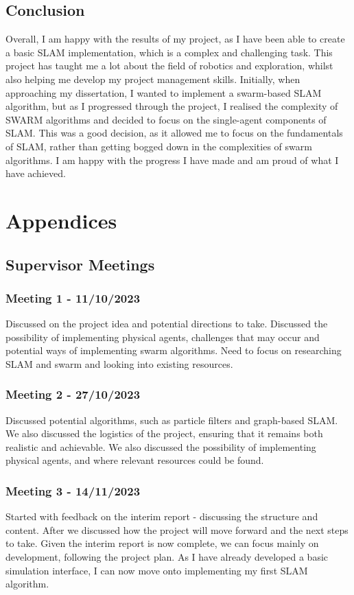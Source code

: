 \documentclass[12pt]{article}
\begin{document}
\subsection{Conclusion}
Overall, I am happy with the results of my project, as I have been able to create a basic SLAM implementation, which is a complex and challenging
task. This project has taught me a lot about the field of robotics and exploration, whilst also helping me develop my project management skills.
Initially, when approaching my dissertation, I wanted to implement a swarm-based SLAM algorithm, but as I progressed through the project, I realised
the complexity of SWARM algorithms and decided to focus on the single-agent components of SLAM. This was a good decision, as it allowed me to
focus on the fundamentals of SLAM, rather than getting bogged down in the complexities of swarm algorithms. I am happy with the progress I have
made and am proud of what I have achieved.\\

\newpage

\section{Appendices}

\subsection{Supervisor Meetings}    %

\subsubsection{Meeting 1 - 11/10/2023}
Discussed on the project idea and potential directions to take. Discussed the possibility of implementing physical agents,
challenges that may occur and potential ways of implementing swarm algorithms. Need to focus on researching SLAM and swarm
and looking into existing resources.
\subsubsection{Meeting 2 - 27/10/2023}
Discussed potential algorithms, such as particle filters and graph-based SLAM. We also discussed the logistics of the project,
ensuring that it remains both realistic and achievable. We also discussed the possibility of implementing physical agents,
and where relevant resources could be found.
\subsubsection{Meeting 3 - 14/11/2023}
Started with feedback on the interim report - discussing the structure and content. After we discussed how the project will
move forward and the next steps to take. Given the interim report is now complete, we can focus mainly on development, following
the project plan. As I have already developed a basic simulation interface, I can now move onto implementing my first SLAM algorithm.
\end{document}

